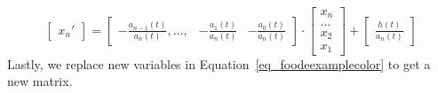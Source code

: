 \begin{equation}
  \begin{bmatrix}
		x_{n}'
	\end{bmatrix}
  = 
	\begin{bmatrix}
		-\frac{a_{n-1}(t)}{a_n(t)}, \dots, & -\frac{a_{1}(t)}{a_n(t)} & -\frac{a_{0}(t)}{a_n(t)}
	\end{bmatrix}
	\cdot
	\begin{bmatrix}
		x_{n} \\
		\dots \\
    x_{2} \\
		x_{1}  
	\end{bmatrix}
	+
	\begin{bmatrix}
		\frac{h(t)}{a_n(t)}
	\end{bmatrix}
  \nonumber
\end{equation}
Lastly, we replace new variables in Equation~\ref{eq_foodeexamplecolor} to get a new matrix.
